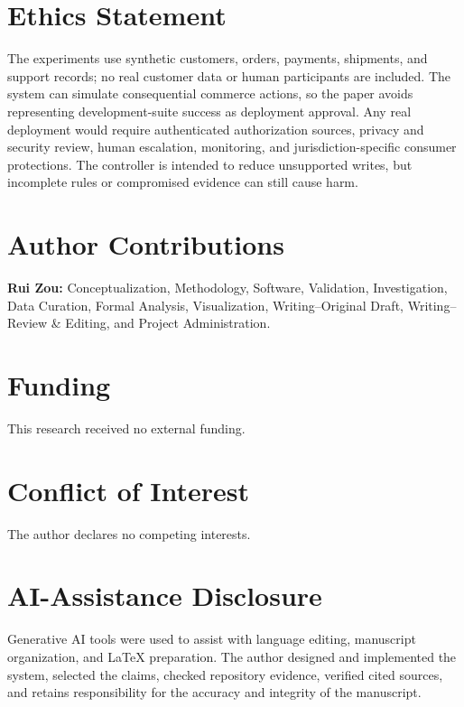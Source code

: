 \documentclass[11pt]{article}
\begin{document}
\section*{Ethics Statement}

The experiments use synthetic customers, orders, payments, shipments, and support records; no real customer data or human participants are included. The system can simulate consequential commerce actions, so the paper avoids representing development-suite success as deployment approval. Any real deployment would require authenticated authorization sources, privacy and security review, human escalation, monitoring, and jurisdiction-specific consumer protections. The controller is intended to reduce unsupported writes, but incomplete rules or compromised evidence can still cause harm.

\section*{Author Contributions}

\textbf{Rui Zou:} Conceptualization, Methodology, Software, Validation, Investigation, Data Curation, Formal Analysis, Visualization, Writing--Original Draft, Writing--Review \& Editing, and Project Administration.

\section*{Funding}

This research received no external funding.

\section*{Conflict of Interest}

The author declares no competing interests.

\section*{AI-Assistance Disclosure}

Generative AI tools were used to assist with language editing, manuscript organization, and LaTeX preparation. The author designed and implemented the system, selected the claims, checked repository evidence, verified cited sources, and retains responsibility for the accuracy and integrity of the manuscript.

\appendix
\end{document}
